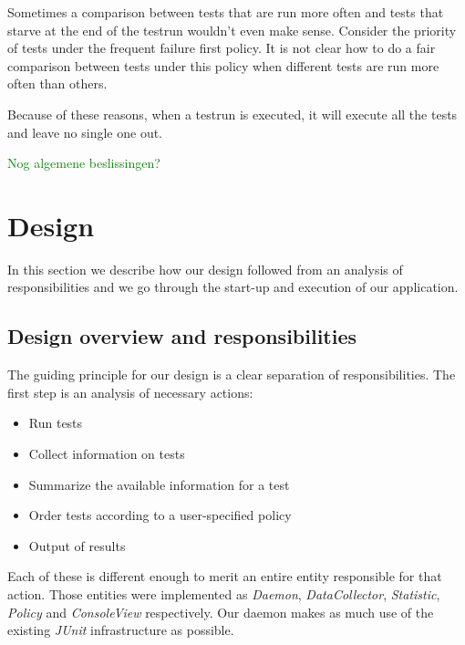 \documentclass[i2]{oss}
\newcommand{\class}[1]{\emph{#1}}
\newcommand{\junit}{\emph{JUnit }}
\newcommand{\comment}[1]{{\huge \textcolor{green}{#1}}\\}
\begin{document}
Sometimes a comparison between tests that are run more often and tests that starve at the end of the testrun wouldn't even make sense.
Consider the priority of tests under the frequent failure first policy.
It is not clear how to do a fair comparison between tests under this policy when different tests are run more often than others.

Because of these reasons, when a testrun is executed, it will execute all the tests and leave no single one out.

\comment{Nog algemene beslissingen?}

\section{Design}
\label{ssec:design}

In this section we describe how our design followed from an analysis
of responsibilities and we go through the start-up and execution of 
our application.

\subsection{Design overview and responsibilities}
\label{subssec: Design overview}

The guiding principle for our design is a clear separation of 
responsibilities. The first step is an analysis of necessary actions:

\begin{itemize}
	\item Run tests
    \item Collect information on tests
    \item Summarize the available information for a test
    \item Order tests according to a user-specified policy
    \item Output of results
\end{itemize}

Each of these is different enough to merit an entire entity responsible 
for that action. Those entities were implemented as \class{Daemon},
\class{DataCollector}, \class{Statistic}, \class{Policy} and
\class{ConsoleView} respectively. Our daemon makes as much use of the 
existing \junit infrastructure as possible. 
\end{document}
